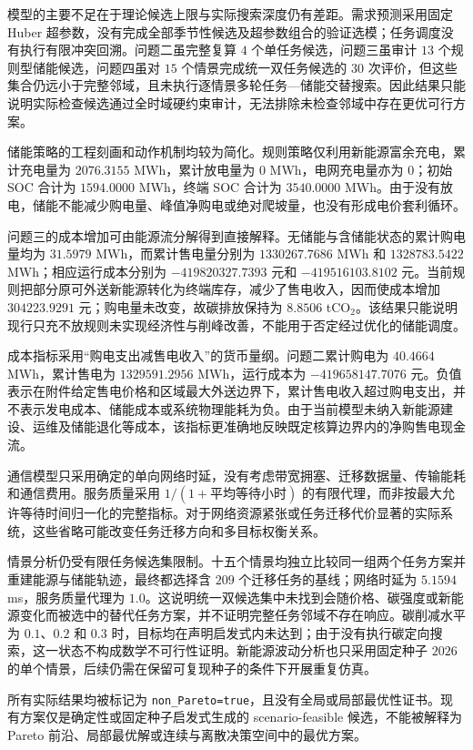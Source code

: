 模型的主要不足在于理论候选上限与实际搜索深度仍有差距。需求预测采用固定 Huber 超参数，没有完成全部季节性候选及超参数组合的验证选模；任务调度没有执行有限冲突回溯。问题二虽完整复算 $4$ 个单任务候选，问题三虽审计 $13$ 个规则型储能候选，问题四虽对 $15$ 个情景完成统一双任务候选的 $30$ 次评价，但这些集合仍远小于完整邻域，且未执行逐情景多轮任务—储能交替搜索。因此结果只能说明实际检查候选通过全时域硬约束审计，无法排除未检查邻域中存在更优可行方案。

储能策略的工程刻画和动作机制均较为简化。规则策略仅利用新能源富余充电，累计充电量为 $2076.3155$ MWh，累计放电量为 $0$ MWh，电网充电量亦为 $0$；初始 SOC 合计为 $1594.0000$ MWh，终端 SOC 合计为 $3540.0000$ MWh。由于没有放电，储能不能减少购电量、峰值净购电或绝对爬坡量，也没有形成电价套利循环。

问题三的成本增加可由能源流分解得到直接解释。无储能与含储能状态的累计购电量均为 $31.5979$ MWh，而累计售电量分别为 $1330267.7686$ MWh 和 $1328783.5422$ MWh；相应运行成本分别为 $-419820327.7393$ 元和 $-419516103.8102$ 元。当前规则把部分原可外送新能源转化为终端库存，减少了售电收入，因而使成本增加 $304223.9291$ 元；购电量未改变，故碳排放保持为 $8.8506$ tCO$_2$。该结果只能说明现行只充不放规则未实现经济性与削峰改善，不能用于否定经过优化的储能调度。

成本指标采用“购电支出减售电收入”的货币量纲。问题二累计购电为 $40.4664$ MWh，累计售电为 $1329591.2956$ MWh，运行成本为 $-419658147.7076$ 元。负值表示在附件给定售电价格和区域最大外送边界下，累计售电收入超过购电支出，并不表示发电成本、储能成本或系统物理能耗为负。由于当前模型未纳入新能源建设、运维及储能退化等成本，该指标更准确地反映既定核算边界内的净购售电现金流。

通信模型只采用确定的单向网络时延，没有考虑带宽拥塞、迁移数据量、传输能耗和通信费用。服务质量采用 $1/(1+\text{平均等待小时})$ 的有限代理，而非按最大允许等待时间归一化的完整指标。对于网络资源紧张或任务迁移代价显著的实际系统，这些省略可能改变任务迁移方向和多目标权衡关系。

情景分析仍受有限任务候选集限制。十五个情景均独立比较同一组两个任务方案并重建能源与储能轨迹，最终都选择含 $209$ 个迁移任务的基线；网络时延为 $5.1594$ ms，服务质量代理为 $1.0$。这说明统一双候选集中未找到会随价格、碳强度或新能源变化而被选中的替代任务方案，并不证明完整任务邻域不存在响应。碳削减水平为 $0.1$、$0.2$ 和 $0.3$ 时，目标均在声明启发式内未达到；由于没有执行碳定向搜索，这一状态不构成数学不可行性证明。新能源波动分析也只采用固定种子 $2026$ 的单个情景，后续仍需在保留可复现种子的条件下开展重复仿真。

所有实际结果均被标记为 \texttt{non\_Pareto=true}，且没有全局或局部最优性证书。现有方案仅是确定性或固定种子启发式生成的 scenario-feasible 候选，不能被解释为 Pareto 前沿、局部最优解或连续与离散决策空间中的最优方案。

